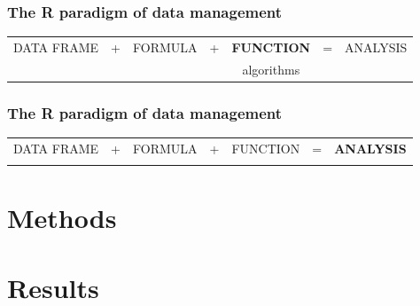 \documentclass{beamer}
\numberwithin{exercise}{section}
\begin{document}
\setlength{\tabcolsep}{2.5pt}
\begin{frame}
\frametitle{The R paradigm of data management}
\begin{center}
\begin{tabular}{ccccccc}
DATA FRAME&+&FORMULA&+&\textbf{FUNCTION}&=&ANALYSIS \\
&&&&algorithms \\
\end{tabular}
\end{center}
\end{frame}
\setlength{\tabcolsep}{6pt}

\setlength{\tabcolsep}{2.5pt}
\begin{frame}
\frametitle{The R paradigm of data management}
\begin{center}
\begin{tabular}{ccccccc}
DATA FRAME&+&FORMULA&+&FUNCTION&=&\textbf{ANALYSIS} \\
 \\
\end{tabular}
\end{center}
\end{frame}
\setlength{\tabcolsep}{6pt}

\section{Methods}

\section{Results}
\end{document}
